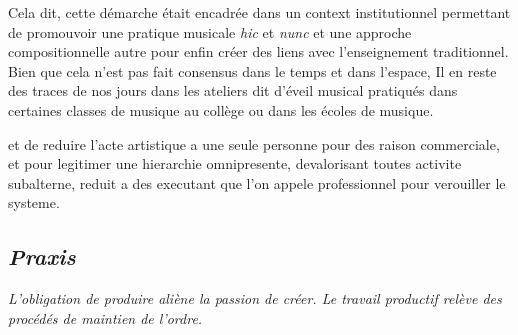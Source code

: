 \documentclass{article}
\begin{document}
Cela dit, cette démarche était encadrée dans un context institutionnel permettant de promouvoir une pratique musicale \textit{hic}  et \textit{nunc} et une approche compositionnelle autre pour enfin créer des liens avec l'enseignement traditionnel. Bien que cela n'est pas fait consensus dans le temps et dans l'espace, Il en reste des traces de nos jours dans les ateliers dit d'éveil musical pratiqués dans certaines classes de musique au collège ou dans les écoles de musique. 



et de reduire l'acte artistique a une seule personne pour des raison commerciale, et pour legitimer une hierarchie omnipresente, devalorisant toutes activite subalterne, reduit a des executant que l'on appele professionnel pour verouiller le systeme.


\subsection{\textit{Praxis}} 

\textit{L’obligation de produire aliène la passion de créer. Le travail productif relève des procédés de maintien de l’ordre.}%
\end{document}

